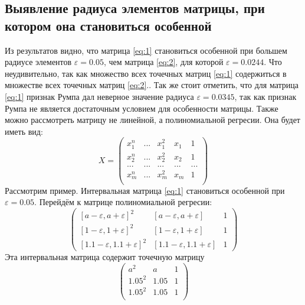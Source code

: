 \documentclass[a4paper,12pt]{article}
\begin{document}
    \subsection{Выявление радиуса элементов матрицы, при котором она становиться особенной}
    Из результатов видно, что матрица \ref{eq:1} становиться особенной при большем радиусе элементов $ \varepsilon = 0.05 $,
    чем матрица \ref{eq:2}, для которой $ \varepsilon = 0.0244 $. Что неудивительно, 
    так как множество всех точечных матриц \ref{eq:1} содержиться в множестве всех точечных матриц \ref{eq:2}..\newline
    Так же стоит отметить, что для матрица \ref{eq:1} признак Румпа дал неверное значение радиуса $ \varepsilon = 0.0345 $,
    так как признак Румпа не является достаточным условием для особенности матрицы.\newline
    Также можно рассмотреть матрицу не линейной, а полиномиальной регресии. Она будет иметь вид:
    \begin{equation}
        X = 
        \begin{pmatrix}
            x_{1}^{n} & ... & x_{1}^{2} & x_{1} & 1\\
            x_{2}^{n} & ... & x_{2}^{2} & x_{2} & 1\\
            ... & ... & ... & ... & ...\\
            x_{m}^{n} & ... & x_{m}^{2} & x_{m} & 1\\
        \end{pmatrix}
    \end{equation}
    Рассмотрим пример.
    Интервальная матрица \ref{eq:1} становиться особенной при $ \varepsilon = 0.05 $.
    Перейдём к матрице полиномиальной регресии:
    \begin{equation}
        \begin{pmatrix}
            [a - \varepsilon, a + \varepsilon]^{2} & [a - \varepsilon, a + \varepsilon] & 1 \\
            [1 - \varepsilon, 1 + \varepsilon]^{2} & [1 - \varepsilon, 1 + \varepsilon] & 1 \\
            [1.1 - \varepsilon, 1.1 + \varepsilon]^{2} & [1.1 - \varepsilon, 1.1 + \varepsilon] & 1
        \end{pmatrix}
    \end{equation}
    \noindent
    Эта интервальная матрица содержит точечную матрицу
    \begin{equation}
        \begin{pmatrix}
            a^{2} & a & 1 \\
            1.05^{2} & 1.05 & 1 \\
            1.05^{2} & 1.05 & 1 \\
        \end{pmatrix}
    \end{equation}
\end{document}
